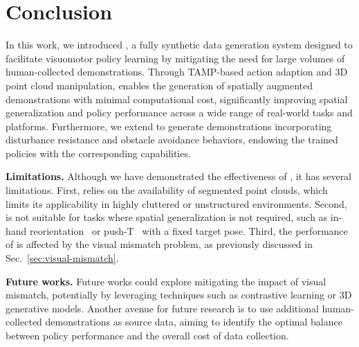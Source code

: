 \section{Conclusion}

In this work, we introduced \method, a fully synthetic data generation system designed to facilitate visuomotor policy learning by mitigating the need for large volumes of human-collected demonstrations. 
Through TAMP-based action adaption and 3D point cloud manipulation, \method enables the generation of spatially augmented demonstrations with minimal computational cost, significantly improving spatial generalization and policy performance across a wide range of real-world tasks and platforms.
Furthermore, we extend \method to generate demonstrations incorporating disturbance resistance and obstacle avoidance behaviors, endowing the trained policies with the corresponding capabilities. 



\vspace{0.2cm} \noindent\textbf{Limitations.} 
Although we have demonstrated the effectiveness of \method, it has several limitations.
First, \method relies on the availability of segmented point clouds, which limits its applicability in highly cluttered or unstructured environments.
Second, \method is not suitable for tasks where spatial generalization is not required, such as in-hand reorientation~\cite{chen2022system} or push-T~\cite{florence2022ibc,chi2023diffusion_policy} with a fixed target pose.
Third, the performance of \method is affected by the visual mismatch problem, as previously discussed in Sec.~\ref{sec:visual-mismatch}. 

\vspace{0.2cm} \noindent\textbf{Future works.} 
Future works could explore mitigating the impact of visual mismatch, potentially by leveraging techniques such as contrastive learning or 3D generative models.
Another avenue for future research is to use additional human-collected demonstrations as source data, aiming to identify the optimal balance between policy performance and the overall cost of data collection.


